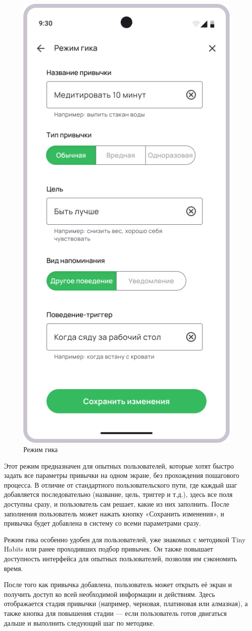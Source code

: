 \documentclass[pdflatex,sn-mathphys-num]{sn-jnl}%
\theoremstyle{thmstyleone}%
\theoremstyle{thmstyletwo}%
\theoremstyle{thmstylethree}%
\begin{document}
\begin{figure}
    \centering
    \includegraphics[width=0.5\linewidth]{figures/App/Habits_add_advanced_good_1.png}
    \caption{Режим гика}
    \label{fig:Habits_add_advanced_good_1}
\end{figure}

Этот режим предназначен для опытных пользователей, которые хотят быстро задать все параметры привычки на одном экране, без прохождения пошагового процесса. В отличие от стандартного пользовательского пути, где каждый шаг добавляется последовательно (название, цель, триггер и т.д.), здесь все поля доступны сразу, и пользователь сам решает, какие из них заполнить. После заполнения пользователь может нажать кнопку «Сохранить изменения», и привычка будет добавлена в систему со всеми параметрами сразу. 

Режим гика особенно удобен для пользователей, уже знакомых с методикой Tiny Habits или ранее проходивших подбор привычек. Он также повышает доступность интерфейса для опытных пользователей, позволяя им сэкономить время.

После того как привычка добавлена, пользователь может открыть её экран и получить доступ ко всей необходимой информации и действиям. Здесь отображается стадия привычки (например, черновая, платиновая или алмазная), а также кнопка для повышения стадии — если пользователь готов двигаться дальше и выполнить следующий шаг по методике.
\end{document}
